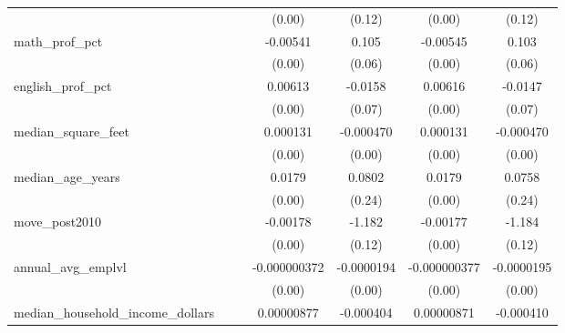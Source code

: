 {\begin{tabular}{l*{6}{c}}
            &                     &                     &      (0.00)         &      (0.12)         &      (0.00)         &      (0.12)         \\
[1em]
math\_prof\_pct&                     &                     &    -0.00541\sym{***}&       0.105         &    -0.00545\sym{***}&       0.103         \\
            &                     &                     &      (0.00)         &      (0.06)         &      (0.00)         &      (0.06)         \\
[1em]
english\_prof\_pct&                     &                     &     0.00613\sym{***}&     -0.0158         &     0.00616\sym{***}&     -0.0147         \\
            &                     &                     &      (0.00)         &      (0.07)         &      (0.00)         &      (0.07)         \\
[1em]
median\_square\_feet&                     &                     &    0.000131\sym{***}&   -0.000470         &    0.000131\sym{***}&   -0.000470         \\
            &                     &                     &      (0.00)         &      (0.00)         &      (0.00)         &      (0.00)         \\
[1em]
median\_age\_years&                     &                     &      0.0179\sym{***}&      0.0802         &      0.0179\sym{***}&      0.0758         \\
            &                     &                     &      (0.00)         &      (0.24)         &      (0.00)         &      (0.24)         \\
[1em]
move\_post2010&                     &                     &    -0.00178         &      -1.182\sym{***}&    -0.00177         &      -1.184\sym{***}\\
            &                     &                     &      (0.00)         &      (0.12)         &      (0.00)         &      (0.12)         \\
[1em]
annual\_avg\_emplvl&                     &                     &-0.000000372\sym{***}&  -0.0000194\sym{**} &-0.000000377\sym{***}&  -0.0000195\sym{**} \\
            &                     &                     &      (0.00)         &      (0.00)         &      (0.00)         &      (0.00)         \\
[1em]
median\_household\_income\_dollars&                     &                     &  0.00000877\sym{***}&   -0.000404\sym{***}&  0.00000871\sym{***}&   -0.000410\sym{***}\\

\end{tabular}}
